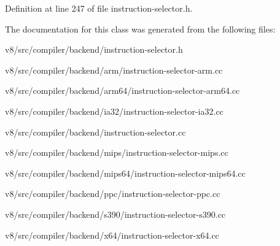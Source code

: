 Definition at line 247 of file instruction-\/selector.\+h.



The documentation for this class was generated from the following files\+:\begin{DoxyCompactItemize}
\item 
v8/src/compiler/backend/instruction-\/selector.\+h\item 
v8/src/compiler/backend/arm/instruction-\/selector-\/arm.\+cc\item 
v8/src/compiler/backend/arm64/instruction-\/selector-\/arm64.\+cc\item 
v8/src/compiler/backend/ia32/instruction-\/selector-\/ia32.\+cc\item 
v8/src/compiler/backend/instruction-\/selector.\+cc\item 
v8/src/compiler/backend/mips/instruction-\/selector-\/mips.\+cc\item 
v8/src/compiler/backend/mips64/instruction-\/selector-\/mips64.\+cc\item 
v8/src/compiler/backend/ppc/instruction-\/selector-\/ppc.\+cc\item 
v8/src/compiler/backend/s390/instruction-\/selector-\/s390.\+cc\item 
v8/src/compiler/backend/x64/instruction-\/selector-\/x64.\+cc\end{DoxyCompactItemize}
